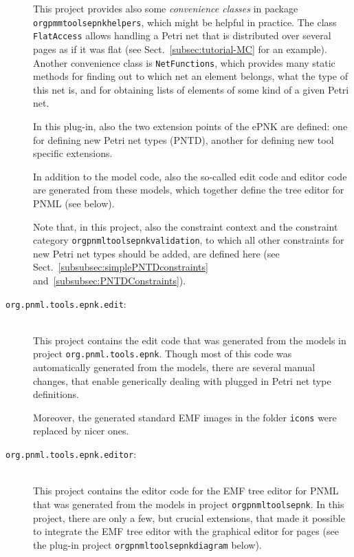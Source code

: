 \begin{description}
    This project provides also some \emph{convenience classes}%
    in package {\tt org\qnsep{}pmm\qnsep{}tools\qnsep{}epnk\qnsep{}helpers},
    which might be helpful in practice. The class {\tt FlatAccess}%
    allows handling a Petri net that is
    distributed over several pages as if it was flat (see
    Sect.~\ref{subsec:tutorial-MC} for an example).
    Another convenience class is {\tt NetFunctions},%
    which provides many static methods for finding out to which net an element
    belongs, what the type of this net is, and for obtaining lists of
    elements of some kind of a given Petri net.
    
    In this plug-in, also the two extension points of the ePNK are defined:
    one for defining new Petri net types (PNTD), another for defining 
    new tool specific extensions.%
    
    In addition to the model code, also the so-called edit code and editor
    code are generated from these models, which together define the tree
    editor for PNML (see below).
    
    Note that, in this project, also the constraint context and the
    constraint category {\tt org\qnsep{}pnml\qnsep{}tools\qnsep{}epnk\qnsep{}validation},%
    to which all other constraints for new Petri net types should be added, are
    defined here (see Sect.~\ref{subsubsec:simplePNTDconstraints}
    and~\ref{subsubsec:PNTDConstraints}).
    
  \item[{\tt org.pnml.tools.epnk.edit}:] ~\\
    This project contains the edit code
    that was generated from the models in project {\tt org.pnml.tools.epnk}.
    Though most of this code was automatically generated from the models,
    there are several manual changes, that enable generically dealing with
    plugged in Petri net type definitions.
    
    Moreover, the generated standard EMF images in the folder {\tt icons}
    were replaced by nicer ones.
    
  \item[{\tt org.pnml.tools.epnk.editor}:] ~\\
    This project contains the editor
    code for the EMF tree editor for PNML that was generated from the models in
    project {\tt org\qnsep{}pnml\qnsep{}tools\qnsep{}epnk}. In this project,
    there are only a few, but crucial extensions, that made it possible to
    integrate the EMF tree editor with the graphical editor for pages (see the
    plug-in project
    {\tt org\qnsep{}pnml\qnsep{}tools\qnsep{}epnk\qnsep{}diagram} below).
              

\end{description}
